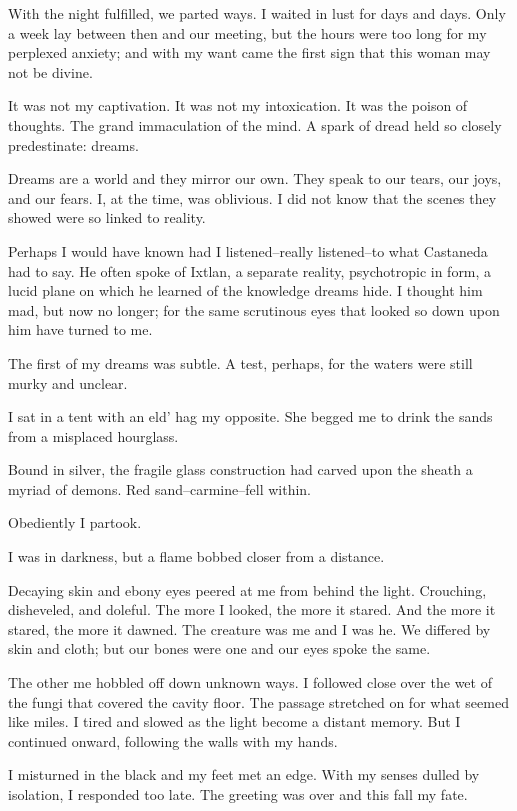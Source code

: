 \documentclass{article}
\begin{document}
With the night fulfilled, we parted ways.
I waited in lust for days and days.
Only a week lay between then and our meeting,
but the hours were too long for my perplexed anxiety;
and with my want came the first sign that this woman may not be divine.


It was not my captivation.
It was not my intoxication.
It was the poison of thoughts.
The grand immaculation of the mind.
A spark of dread held so closely predestinate: dreams.
\VV


\noindent
Dreams are a world and they mirror our own.
They speak to our tears, our joys, and our fears.
I, at the time, was oblivious.
I did not know that the scenes they
showed were so linked to reality.


Perhaps I would have known had I listened--really listened--to
what Castaneda had to say.
He often spoke of Ixtlan,
a separate reality,
psychotropic in form,
a lucid plane on which he learned of the knowledge dreams hide.
I thought him mad, but now no longer;
for the same scrutinous eyes that looked so down upon him
have turned to me.
\VV


\noindent
The first of my dreams was subtle.
A test, perhaps, for the waters were still murky and unclear.
\vvvv


\noindent
I sat in a tent with an eld' hag my opposite.
She begged me to drink the sands from a misplaced hourglass.


Bound in silver, the fragile glass construction had
carved upon the sheath a myriad of demons.
Red sand--carmine--fell within.


Obediently I partook.


\noindent
I was in darkness, but a flame bobbed closer from a distance.


Decaying skin and ebony eyes peered at me from behind the light.
Crouching, disheveled, and doleful.
The more I looked, the more it stared.
And the more it stared, the more it dawned.
The creature was me and I was he.
We differed by skin and cloth; but our bones were one
and our eyes spoke the same.


The other me hobbled off down unknown ways.
I followed close over the wet of the fungi that
covered the cavity floor.
The passage stretched on for what seemed like miles.
I tired and slowed as the light become a distant memory.
But I continued onward, following the walls with my hands.


I misturned in the black and my feet met an edge.
With my senses dulled by isolation, I responded too late.
The greeting was over and this fall my fate.
\vvvv
\end{document}
